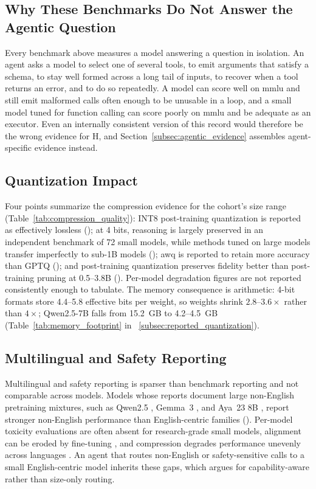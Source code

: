 \subsection{Why These Benchmarks Do Not Answer the Agentic Question}
\label{subsec:reported_agentic_gap}

Every benchmark above measures a model answering a question in isolation. An agent asks a model to select one of several tools, to emit arguments that satisfy a schema, to stay well formed across a long tail of inputs, to recover when a tool returns an error, and to do so repeatedly. A model can score well on \gls{mmlu} and still emit malformed calls often enough to be unusable in a loop, and a small model tuned for function calling can score poorly on \gls{mmlu} and be adequate as an executor. Even an internally consistent version of this record would therefore be the wrong evidence for H, and Section~\ref{subsec:agentic_evidence} assembles agent-specific evidence instead.

\subsection{Quantization Impact}
\label{subsec:reported_quantization_summary}

Four points summarize the compression evidence for the cohort's size range (Table~\ref{tab:compression_quality}): INT8 post-training quantization is reported as effectively lossless (\evC); at 4 bits, reasoning is largely preserved in an independent benchmark of 72 small models, while methods tuned on large models transfer imperfectly to sub-1B models (\evB); \gls{awq} is reported to retain more accuracy than GPTQ (\evC); and post-training quantization preserves fidelity better than post-training pruning at 0.5--3.8B (\evA). Per-model degradation figures are not reported consistently enough to tabulate. The memory consequence is arithmetic: 4-bit formats store 4.4--5.8 effective bits per weight, so weights shrink $2.8$--$3.6\times$ rather than $4\times$; Qwen2.5-7B falls from 15.2~GB to 4.2--4.5~GB (Table~\ref{tab:memory_footprint} in \suppsec~\ref{subsec:reported_quantization}).

\subsection{Multilingual and Safety Reporting}
\label{subsec:reported_safety}

Multilingual and safety reporting is sparser than benchmark reporting and not comparable across models. Models whose reports document large non-English pretraining mixtures, such as Qwen2.5 \citep{qwen2024qwen25}, Gemma~3 \citep{team2025gemma3}, and Aya~23 8B \citep{aryabumi2024aya23}, report stronger non-English performance than English-centric families (\evC). Per-model toxicity evaluations are often absent for research-grade small models, alignment can be eroded by fine-tuning \citep{qi2023finetuning}, and compression degrades performance unevenly across languages \citep{blodgett2020language,kurz2025pruning_vs_quant}. An agent that routes non-English or safety-sensitive calls to a small English-centric model inherits these gaps, which argues for capability-aware rather than size-only routing.
